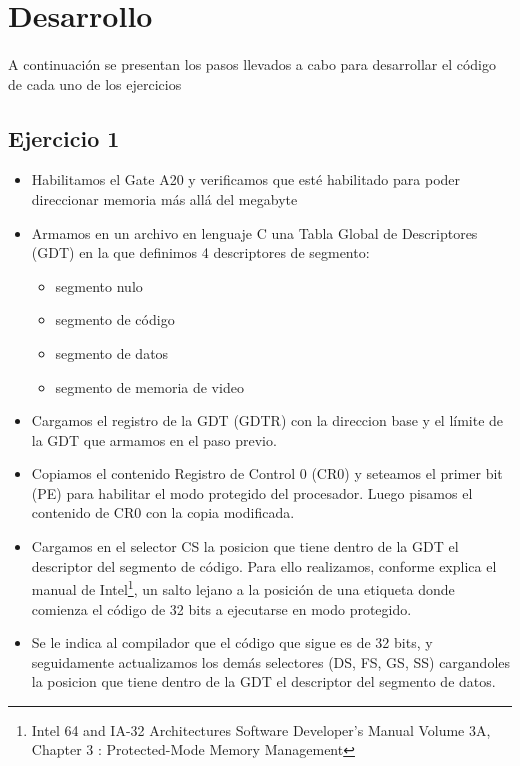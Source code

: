 \section{Desarrollo}
\paragraph{}
A continuaci\'on se presentan los pasos llevados a cabo para desarrollar el c\'odigo de cada uno de los ejercicios

\subsection{Ejercicio 1}
\begin{itemize}
 \item Habilitamos el Gate A20 y verificamos que est\'e habilitado para poder direccionar memoria m\'as all\'a del megabyte
 \item Armamos en un archivo en lenguaje C una Tabla Global de Descriptores (GDT) en la que definimos 4 descriptores de segmento: 
	\begin{itemize}
	\item segmento nulo
	\item segmento de c\'odigo
	\item segmento de datos
	\item segmento de memoria de video
	\end{itemize}

 \item Cargamos el registro de la GDT (GDTR) con la direccion base  y el l\'imite de la GDT que armamos en el paso previo.

 \item Copiamos el contenido Registro de Control 0 (CR0) y seteamos el primer bit (PE) para habilitar el modo protegido del procesador. Luego pisamos el contenido de CR0 con la copia modificada.

 \item Cargamos en el selector CS la posicion que tiene dentro de la GDT el descriptor del segmento de c\'odigo. Para ello realizamos, conforme explica el manual de Intel\footnote{Intel 64 and IA-32 Architectures Software Developer's Manual Volume 3A, Chapter 3 : Protected-Mode Memory Management}, un salto lejano a la posici\'on de una etiqueta donde comienza el c\'odigo de 32 bits a ejecutarse en modo protegido.

 \item Se le indica al compilador que el c\'odigo que sigue es de 32 bits, y seguidamente actualizamos los dem\'as selectores (DS, FS, GS, SS) cargandoles la posicion que tiene dentro de la GDT el descriptor del segmento de datos.


\end{itemize}
